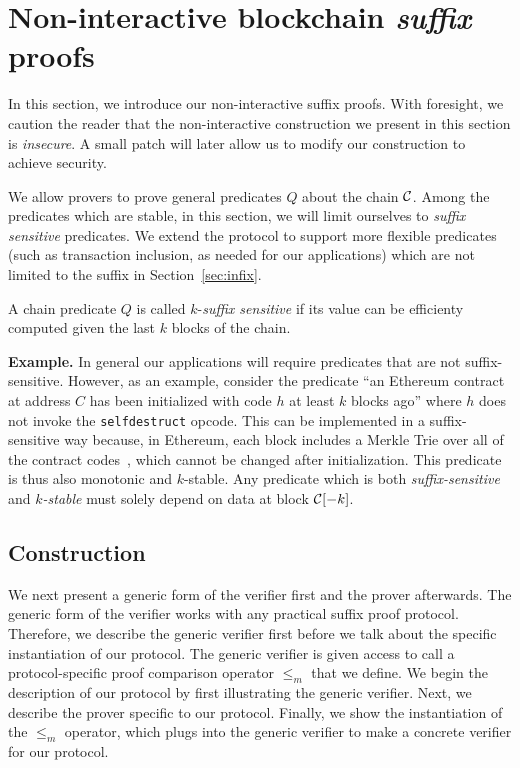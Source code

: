 \section{Non-interactive blockchain \emph{suffix} proofs}\label{sec:suffix}
In this section, we introduce our non-interactive suffix proofs. With foresight,
we caution the reader that the non-interactive construction we present in this
section is \emph{insecure}. A small patch will later allow us to modify our
construction to achieve security.

We allow provers to prove general predicates $Q$ about the chain $\mathcal{C}$.
Among the predicates which are stable, in this section, we will limit ourselves
to \emph{suffix sensitive} predicates.
We extend the protocol to support more flexible predicates
(such as transaction inclusion, as needed for our applications) which are not
limited to the suffix in Section~\ref{sec:infix}.

\begin{definition}
A chain predicate $Q$ is called $k$-\emph{suffix sensitive} if its value
can be efficienty computed given the last $k$ blocks of the chain.
\end{definition}

\noindent\textbf{Example.}
In general our applications will require predicates that are not
suffix-sensitive. However, as an example, consider the predicate ``an Ethereum
contract at address $C$ has been initialized with code $h$ at least $k$ blocks
ago'' where $h$ does not invoke the \texttt{selfdestruct} opcode. This can be
implemented in a suffix-sensitive way because, in Ethereum, each block includes
a Merkle Trie over all of the contract codes~\cite{vitalik,wood}, which cannot be
changed after initialization. This predicate is thus also monotonic and
$k$-stable. Any predicate which is both \emph{suffix-sensitive} and
\emph{$k$-stable} must solely depend on data at block $\mathcal{C}[-k]$.

\subsection{Construction}
We next present a generic form of the verifier first and the prover afterwards.
The generic form of the verifier works with any practical suffix proof protocol.
Therefore, we describe the generic verifier first before we talk about the
specific instantiation of our protocol. The generic verifier is given access to
call a protocol-specific proof comparison operator $\leq_m$ that we define. We
begin the description of our protocol by first illustrating the generic
verifier. Next, we describe the prover specific to our protocol. Finally, we
show the instantiation of the $\leq_m$ operator, which plugs into the generic
verifier to make a concrete verifier for our protocol.

